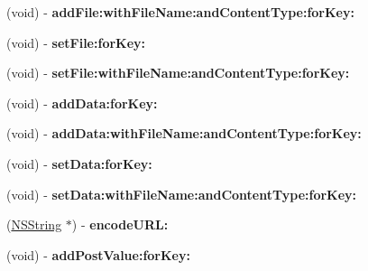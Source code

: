 \begin{DoxyCompactItemize}
\item 
\hypertarget{interface_a_s_i_form_data_request_ae413f676daaf869aa3cac76371466c16}{
(void) -\/ {\bfseries add\-File\-:with\-File\-Name\-:and\-Content\-Type\-:for\-Key\-:}}
\label{interface_a_s_i_form_data_request_ae413f676daaf869aa3cac76371466c16}

\item 
\hypertarget{interface_a_s_i_form_data_request_a8b097474a664290880231fd4439f352e}{
(void) -\/ {\bfseries set\-File\-:for\-Key\-:}}
\label{interface_a_s_i_form_data_request_a8b097474a664290880231fd4439f352e}

\item 
\hypertarget{interface_a_s_i_form_data_request_a1b319de7b302e41e0f2b62b04efd4976}{
(void) -\/ {\bfseries set\-File\-:with\-File\-Name\-:and\-Content\-Type\-:for\-Key\-:}}
\label{interface_a_s_i_form_data_request_a1b319de7b302e41e0f2b62b04efd4976}

\item 
\hypertarget{interface_a_s_i_form_data_request_abeb27ef3dc358d5e0a27ba3a077a6653}{
(void) -\/ {\bfseries add\-Data\-:for\-Key\-:}}
\label{interface_a_s_i_form_data_request_abeb27ef3dc358d5e0a27ba3a077a6653}

\item 
\hypertarget{interface_a_s_i_form_data_request_a8ea88f81e036a80e7e7b7f9af04ac421}{
(void) -\/ {\bfseries add\-Data\-:with\-File\-Name\-:and\-Content\-Type\-:for\-Key\-:}}
\label{interface_a_s_i_form_data_request_a8ea88f81e036a80e7e7b7f9af04ac421}

\item 
\hypertarget{interface_a_s_i_form_data_request_a707a5cef615835146cdbed3ceca31016}{
(void) -\/ {\bfseries set\-Data\-:for\-Key\-:}}
\label{interface_a_s_i_form_data_request_a707a5cef615835146cdbed3ceca31016}

\item 
\hypertarget{interface_a_s_i_form_data_request_abbcca0f83bbe93f0132094a99a274098}{
(void) -\/ {\bfseries set\-Data\-:with\-File\-Name\-:and\-Content\-Type\-:for\-Key\-:}}
\label{interface_a_s_i_form_data_request_abbcca0f83bbe93f0132094a99a274098}

\item 
\hypertarget{interface_a_s_i_form_data_request_ab8c6677cbdb0cd4bf7660b79e5afa334}{
(\hyperlink{class_n_s_string}{\-N\-S\-String} $\ast$) -\/ {\bfseries encode\-U\-R\-L\-:}}
\label{interface_a_s_i_form_data_request_ab8c6677cbdb0cd4bf7660b79e5afa334}

\item 
\hypertarget{interface_a_s_i_form_data_request_af9571a143a9feeb009c33c458447aa98}{
(void) -\/ {\bfseries add\-Post\-Value\-:for\-Key\-:}}
\label{interface_a_s_i_form_data_request_af9571a143a9feeb009c33c458447aa98}


\end{DoxyCompactItemize}
